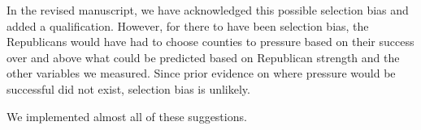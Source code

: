 \documentclass[11pt]{article}
\begin{document}
\begin{enumerate}
  In the revised manuscript, we have acknowledged this possible
  selection bias and added a qualification.  However, for there to
  have been selection bias, the Republicans would have had to choose
  counties to pressure based on their success over and above what
  could be predicted based on Republican strength and the other
  variables we measured.  Since prior evidence on where pressure
  would be successful did not exist, selection bias is unlikely.
\end{enumerate}

\bigskip
{}

We implemented almost all of these suggestions.

  
  
  
  
  
  
  
  
\end{document}
